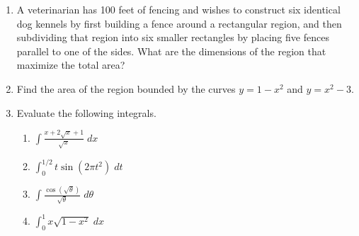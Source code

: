 \documentclass[12pt]{article}
\newcommand{\ds}{\displaystyle}
\begin{document}
\begin{enumerate}
\vfill
\newpage
\item A 
  veterinarian has 100 feet of fencing and wishes to construct six identical
  dog kennels by first building a fence around a rectangular region, and
  then subdividing that region into six smaller rectangles by placing five
  fences parallel to one of the sides.  What are the dimensions of the
  region that maximize the total area? 
\vfill
\newpage
\item Find
  the area of the region bounded by the curves
  $y=1-x^2$ and $y=x^2-3$.
\vfill
\newpage
\item Evaluate 
  the following integrals.
  \begin{enumerate}
  \item $\ds \int \frac{x+2\sqrt{x}+1}{\sqrt{x}} \; dx$
\vfill
  \item $\ds \int_0^{1/2} t \sin(2\pi t^2) \; dt$
\vfill
  \item $\ds \int \frac{\cos(\sqrt{\theta})}{\sqrt{\theta}} \; d\theta$
\vfill
  \item $\ds \int_0^1 x \sqrt{1-x^2} \; dx$
\vfill
  \end{enumerate}
\end{enumerate}
\end{document}
